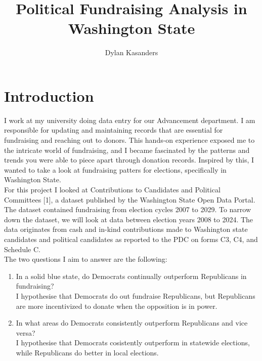 \documentclass[9pt, compsoc, technote, a4paper]{IEEEtran}
\begin{document}
\title{Political Fundraising Analysis in Washington State}

\author{\small{Dylan Kasanders}

}

\maketitle

\section{Introduction}
I work at my university doing data entry for our Advancement department. I am responsible for updating and maintaining records that are essential for fundraising and reaching out to donors. This hands-on experience exposed me to the intricate world of fundraising, and I became fascinated by the patterns and trends you were able to piece apart through donation records. Inspired by this, I wanted to take a look at fundraising patters for elections, specifically in Washington State.
\\
For this project I looked at Contributions to Candidates and Political Committees [1], a dataset published by the Washington State Open Data Portal. The dataset contained fundraising from election cycles 2007 to 2029. To narrow down the dataset, we will look at data between election years 2008 to 2024. The data originates from cash and in-kind contributions made to Washington state candidates and political candidates as reported to the PDC on forms C3, C4, and Schedule C.
\\
The two questions I aim to answer are the following:
\begin{enumerate}
    \item In a solid blue state, do Democrats continually outperform Republicans in fundraising?\\
    I hypothesise that Democrats do out fundraise Republicans, but Republicans are more incentivized to donate when the opposition is in power.
    \item In what areas do Democrats consistently outperform Republicans and vice versa?\\
    I hypothesise that Democrats cosistently outperform in statewide elections, while Republicans do better in local elections.
\end{enumerate}
\end{document}
